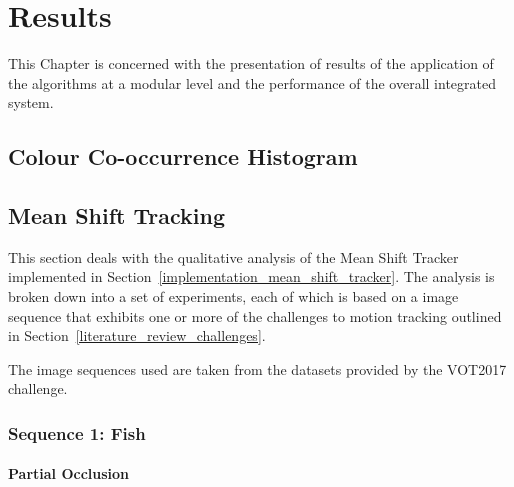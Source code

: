 \chapter{Results} \label{chapter_results}

This Chapter is concerned with the presentation of results of the application of
the algorithms at a modular level and the performance of the overall integrated system.

\section{Colour Co-occurrence Histogram}



\section{Mean Shift Tracking}
This section deals with the qualitative analysis of the Mean Shift Tracker
implemented in Section~\ref{implementation_mean_shift_tracker}. The analysis is
broken down into a set of experiments, each of which is based on a image
sequence that exhibits one or more of the challenges to motion tracking outlined
in Section~\ref{literature_review_challenges}. 

The image sequences used are taken from the datasets provided by the VOT2017
challenge. \cite{VOT_TPAMI}

\subsection{Sequence 1: Fish}

\subsubsection{Partial Occlusion}

